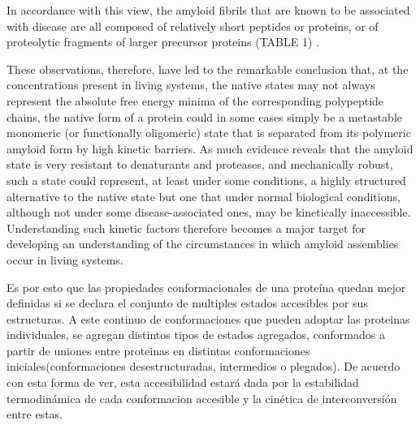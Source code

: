In accordance with this view,
the amyloid fibrils that are known to be associated with
disease are all composed of relatively short peptides or
proteins, or of proteolytic fragments of larger precursor
proteins (TABLE 1) .

















These observations, therefore, have led to the remarkable conclusion that,
at the concentrations present in living systems,
the native states may not always represent
the absolute free energy minima of the corresponding polypeptide chains, the native form of a protein could in some cases simply be a metastable monomeric
(or functionally oligomeric) state that is separated from
its polymeric amyloid form by high kinetic barriers.
As much evidence reveals that the amyloid state is
very resistant to denaturants and proteases, and mechanically robust, such a state could represent, at least under
some conditions, a highly structured alternative to the
native state but one that under normal biological conditions, although not under some disease-associated ones,
may be kinetically inaccessible. 
Understanding such kinetic factors therefore becomes a major target for developing an understanding of the circumstances in which
amyloid assemblies occur in living systems.






Es por esto que las propiedades conformacionales de una proteína quedan mejor definidas si se declara el conjunto de multiples estados accesibles por sus estructuras.
A este continuo de conformaciones que pueden adoptar las proteinas individuales, se agregan distintos tipos de estados agregados, conformados a partir de uniones entre proteinas 
en distintas conformaciones iniciales(conformaciones desestructuradas, intermedios o plegados).
De acuerdo con esta forma de ver, esta accesibilidad estará dada por la estabilidad termodinámica de cada conformacion accesible y la cinética de interconversión entre estas.

